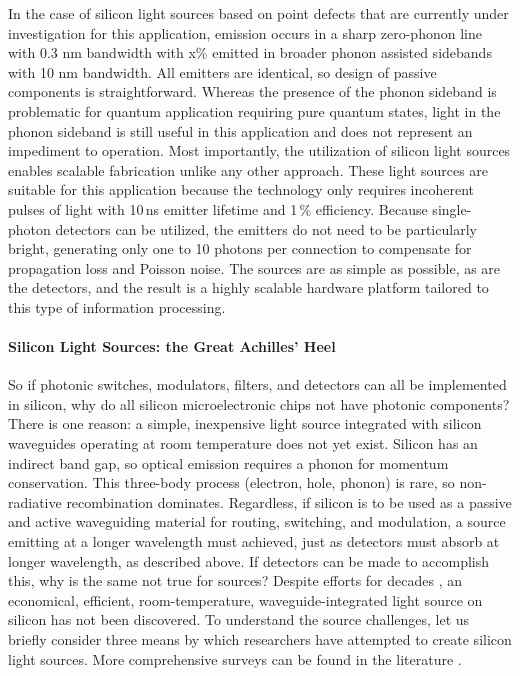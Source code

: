 In the case of silicon light sources based on point defects that are currently under investigation for this application, emission occurs in a sharp zero-phonon line with 0.3 nm bandwidth with x\% emitted in broader phonon assisted sidebands with 10 nm bandwidth. All emitters are identical, so design of passive components is straightforward. Whereas the presence of the phonon sideband is problematic for quantum application requiring pure quantum states, light in the phonon sideband is still useful in this application and does not represent an impediment to operation. Most importantly, the utilization of silicon light sources enables scalable fabrication unlike any other approach. These light sources are suitable for this application because the technology only requires incoherent pulses of light with 10\,ns emitter lifetime and 1\,\% efficiency. Because single-photon detectors can be utilized, the emitters do not need to be particularly bright, generating only one to 10 photons per connection to compensate for propagation loss and Poisson noise. The sources are as simple as possible, as are the detectors, and the result is a highly scalable hardware platform tailored to this type of information processing.


\paragraph{Silicon Light Sources: the Great Achilles' Heel}
So if photonic switches, modulators, filters, and detectors can all be implemented in silicon, why do all silicon microelectronic chips not have photonic components? There is one reason: a simple, inexpensive light source integrated with silicon waveguides operating at room temperature does not yet exist. Silicon has an indirect band gap, so optical emission requires a phonon for momentum conservation. This three-body process (electron, hole, phonon) is rare, so non-radiative recombination dominates. Regardless, if silicon is to be used as a passive and active waveguiding material for routing, switching, and modulation, a source emitting at a longer wavelength must achieved, just as detectors must absorb at longer wavelength, as described above. If detectors can be made to accomplish this, why is the same not true for sources? Despite efforts for decades \cite{shxu2007}, an economical, efficient, room-temperature, waveguide-integrated light source on silicon has not been discovered. To understand the source challenges, let us briefly consider three means by which researchers have attempted to create silicon light sources. More comprehensive surveys can be found in the literature \cite{li2005,shxu2007,libo2010,zhyi2015}.

